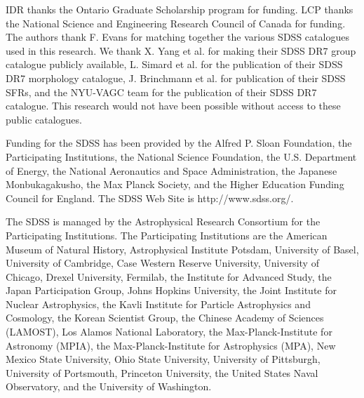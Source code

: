 \documentclass[a4paper,fleqn,usenatbib]{mnras}
\begin{document}
IDR thanks the Ontario Graduate Scholarship program for funding.  LCP
thanks the National Science and Engineering Research
Council of Canada for funding.  The authors thank
F. Evans for matching together the various SDSS catalogues used in
this research.  We thank X. Yang et al. for
making their
SDSS DR7 group catalogue publicly available, L. Simard et al. for the
publication of their SDSS DR7 morphology catalogue, J. Brinchmann et al. for
publication of their SDSS SFRs, and the NYU-VAGC
team for the 
publication of their SDSS DR7 catalogue.  This research would not have
been possible without access to these public catalogues.
\par
Funding for the SDSS has been provided by the Alfred P. Sloan
Foundation, the Participating Institutions, the National Science
Foundation, the U.S. Department of Energy, the National Aeronautics
and Space Administration, the Japanese Monbukagakusho, the Max Planck
Society, and the Higher Education Funding Council for England. The
SDSS Web Site is http://www.sdss.org/.
\par
The SDSS is managed by the Astrophysical Research Consortium for the
Participating Institutions. The Participating Institutions are the
American Museum of Natural History, Astrophysical Institute Potsdam,
University of Basel, University of Cambridge, Case Western Reserve
University, University of Chicago, Drexel University, Fermilab, the
Institute for Advanced Study, the Japan Participation Group, Johns
Hopkins University, the Joint Institute for Nuclear Astrophysics, the
Kavli Institute for Particle Astrophysics and Cosmology, the Korean
Scientist Group, the Chinese Academy of Sciences (LAMOST), Los Alamos
National Laboratory, the Max-Planck-Institute for Astronomy (MPIA),
the Max-Planck-Institute for Astrophysics (MPA), New Mexico State
University, Ohio State University, University of Pittsburgh,
University of Portsmouth, Princeton University, the United States
Naval Observatory, and the University of Washington.









\bsp	%
\label{lastpage}
\end{document}
